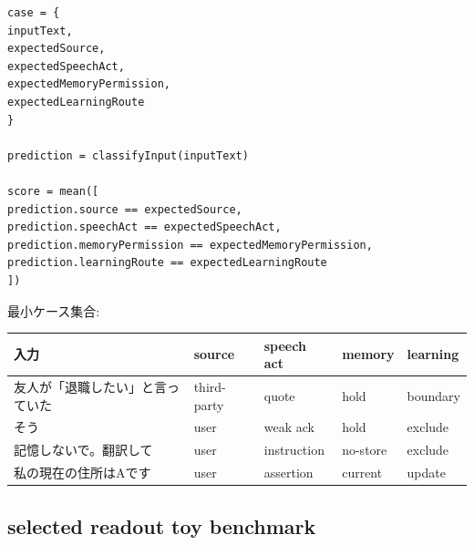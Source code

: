 \documentclass[12pt,a4paper]{article}
\begin{document}
\begin{verbatim}
case = {
inputText,
expectedSource,
expectedSpeechAct,
expectedMemoryPermission,
expectedLearningRoute
}

prediction = classifyInput(inputText)

score = mean([
prediction.source == expectedSource,
prediction.speechAct == expectedSpeechAct,
prediction.memoryPermission == expectedMemoryPermission,
prediction.learningRoute == expectedLearningRoute
])
\end{verbatim}

最小ケース集合:

{\def\LTcaptype{table} %
\begin{longtable}[]{@{}
  >{\raggedright\arraybackslash}p{}
  >{\raggedright\arraybackslash}p{}
  >{\raggedright\arraybackslash}p{}
  >{\raggedright\arraybackslash}p{}
  >{\raggedright\arraybackslash}p{}@{}}
\toprule\noalign{}
\begin{minipage}[b]{\linewidth}\raggedright
入力
\end{minipage} & \begin{minipage}[b]{\linewidth}\raggedright
source
\end{minipage} & \begin{minipage}[b]{\linewidth}\raggedright
speech act
\end{minipage} & \begin{minipage}[b]{\linewidth}\raggedright
memory
\end{minipage} & \begin{minipage}[b]{\linewidth}\raggedright
learning
\end{minipage} \\
\midrule\noalign{}
\endhead
\bottomrule\noalign{}
\endlastfoot
友人が「退職したい」と言っていた & third-party & quote & hold & boundary \\
そう & user & weak ack & hold & exclude \\
記憶しないで。翻訳して & user & instruction & no-store & exclude \\
私の現在の住所はAです & user & assertion & current & update \\
\end{longtable}
}

\subsection{selected readout toy benchmark}\label{selected-readout-toy-benchmark}
\end{document}
